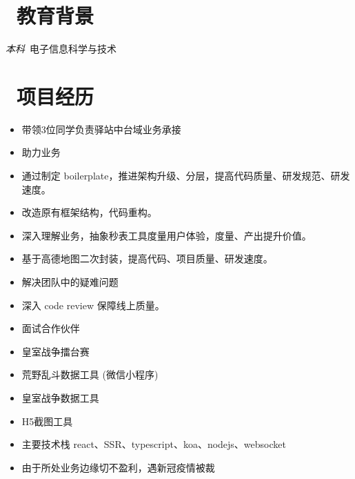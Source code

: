 \documentclass{resume}
\begin{document}


 
\section{\faGraduationCap\  教育背景}
\textit{本科}\ 电子信息科学与技术

\section{\faUsers\ 项目经历}
\begin{itemize}
  \item 带领3位同学负责驿站中台域业务承接
  \item 助力业务
  \item 通过制定 boilerplate，推进架构升级、分层，提高代码质量、研发规范、研发速度。
  \item 改造原有框架结构，代码重构。
  \item 深入理解业务，抽象秒表工具度量用户体验，度量、产出提升价值。
  \item 基于高德地图二次封装，提高代码、项目质量、研发速度。
  \item 解决团队中的疑难问题
  \item 深入 code review 保障线上质量。
  \item 面试合作伙伴
\end{itemize}

\begin{itemize}
    \item 皇室战争擂台赛
    \item 荒野乱斗数据工具 (微信小程序)
    \item 皇室战争数据工具
    \item H5截图工具
    \item 主要技术栈 react、SSR、typescript、koa、nodejs、websocket
    \item 由于所处业务边缘切不盈利，遇新冠疫情被裁
\end{itemize}
\end{document}
